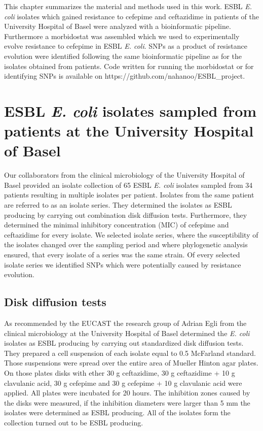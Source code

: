 This chapter summarizes the material and methods used in this work. ESBL \textit{E. coli} isolates which gained resistance to cefepime and ceftazidime in patients of the University Hospital of Basel were analyzed with a bioinformatic pipeline. Furthermore a morbidostat was assembled which we used to experimentally evolve resistance to cefepime in ESBL \textit{E. coli}. SNPs as a product of resistance evolution were identified following the same bioinformatic pipeline as for the isolates obtained from patients. Code written for running the morbidostat or for identifying SNPs is available on  https://github.com/nahanoo/ESBL\_project.

\section{ESBL \textit{E. coli} isolates sampled from patients at the University Hospital of Basel}
Our collaborators from the clinical microbiology of the University Hospital of Basel provided an isolate collection of 65 ESBL \textit{E. coli} isolates sampled from 34 patients resulting in multiple isolates per patient. Isolates from the same patient are referred to as an isolate series. They determined the isolates as ESBL producing by carrying out combination disk diffusion tests. Furthermore, they determined the minimal inhibitory concentration (MIC) of cefepime and ceftazidime for every isolate. We selected isolate series, where the susceptibility of the isolates changed over the sampling period and where phylogenetic analysis ensured, that every isolate of a series was the same strain. Of every selected isolate series we identified SNPs which were potentially caused by resistance evolution. 
\label{section:sample_collection}

\subsection{Disk diffusion tests}
As recommended by the EUCAST the research group of Adrian Egli from the clinical microbiology at the University Hospital of Basel determined the \textit{E. coli} isolates as ESBL producing by carrying out standardized disk diffusion tests. \\
They prepared a cell suspension of each isolate equal to 0.5 McFarland standard. Those suspensions were spread over the entire area of Mueller Hinton agar plates. On those plates disks with ether 30 \textmu g ceftazidime, 30 \textmu g ceftazidime + 10 \textmu g clavulanic acid, 30 \textmu g cefepime and 30 \textmu g cefepime + 10 \textmu g clavulanic acid were applied. All plates were incubated for 20 hours. The inhibition zones caused by the disks were measured, if the inhibition diameters were larger than 5 mm the isolates were determined as ESBL producing. All of the isolates form the collection turned out to be ESBL producing. 

